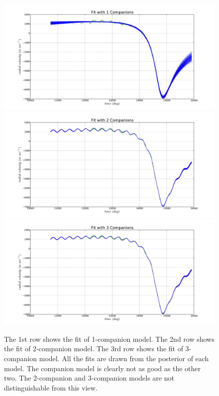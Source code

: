 \documentclass[letterpaper, preprint]{aastex}
\begin{document}
\begin{figure}
 \centering
 \includegraphics[width=0.85\linewidth]{fit_122_comp_1.pdf}\\
 \includegraphics[width=0.85\linewidth]{fit_122_comp_2.pdf}\\
\includegraphics[width=0.85\linewidth]{fit_122_comp_3.pdf}
\caption{The 1st row shows the fit of 1-companion model. The 2nd row shows the fit of 2-companion model. The 3rd row shows the fit of 3-companion model. All the fits are drawn from the posterior of each model. The companion model is clearly not as good as the other two. The 2-companion and 3-companion models are not distinguishable from this view.}
 \label{fig:fit-122-1-2-3}
\end{figure}
\end{document}
